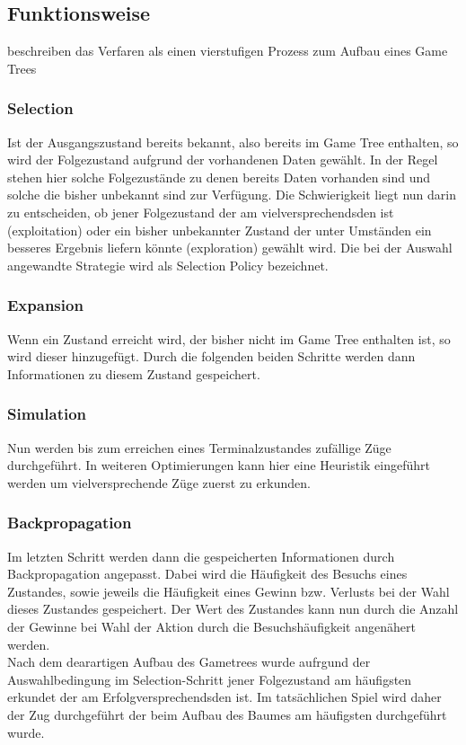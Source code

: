 \subsection{Funktionsweise}
\cite{chaslot2008monte} beschreiben das Verfaren als einen vierstufigen Prozess zum Aufbau eines Game Trees
\subsubsection{Selection}
Ist der Ausgangszustand bereits bekannt, also bereits im Game Tree enthalten, so wird der Folgezustand aufgrund der vorhandenen Daten gewählt. In der Regel stehen hier solche Folgezustände zu denen bereits Daten vorhanden sind und solche die bisher unbekannt sind zur Verfügung. Die Schwierigkeit liegt nun darin zu entscheiden, ob jener Folgezustand der am vielversprechendsden ist (exploitation) oder ein bisher unbekannter Zustand der unter Umständen ein besseres Ergebnis liefern könnte (exploration) gewählt wird. Die bei der Auswahl angewandte Strategie wird als Selection Policy bezeichnet.
\subsubsection{Expansion}
Wenn ein Zustand erreicht wird, der bisher nicht im Game Tree enthalten ist, so wird dieser hinzugefügt. Durch die folgenden beiden Schritte werden dann Informationen zu diesem Zustand gespeichert.
\subsubsection{Simulation}
Nun werden bis zum erreichen eines Terminalzustandes zufällige Züge durchgeführt. In weiteren Optimierungen kann hier eine Heuristik eingeführt werden um vielversprechende Züge zuerst zu erkunden.
\subsubsection{Backpropagation}
Im letzten Schritt werden dann die gespeicherten Informationen durch Backpropagation angepasst. Dabei wird die Häufigkeit des Besuchs eines Zustandes, sowie jeweils die Häufigkeit eines Gewinn bzw. Verlusts bei der Wahl dieses Zustandes gespeichert. Der Wert des Zustandes kann nun durch die Anzahl der Gewinne bei Wahl der Aktion durch die Besuchshäufigkeit angenähert werden.\\
Nach dem dearartigen Aufbau des Gametrees wurde aufrgund der Auswahlbedingung im Selection-Schritt jener Folgezustand am häufigsten erkundet der am Erfolgversprechendsden ist. Im tatsächlichen Spiel wird daher der Zug durchgeführt der beim Aufbau des Baumes am häufigsten durchgeführt wurde.
